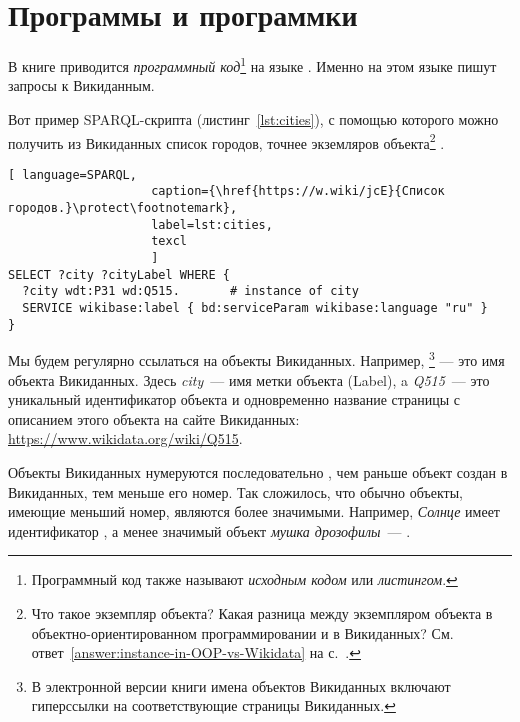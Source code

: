 





\chapter{Программы и программки}
\label{ch:listing_about}

В книге приводится \emph{программный код}\footnote[][0cm]{%
    Программный код также называют  \emph{исходным кодом} или 
    \emph{листингом}.
%   
} на языке . 
Именно на этом языке пишут запросы к Викиданным.


Вот пример SPARQL-скрипта (листинг~\ref{lst:cities}), 
с помощью которого можно получить из Викиданных список городов, 
точнее экземляров объекта\footnote{\label{question:instance-in-OOP-vs-Wikidata}Что такое экземпляр объекта? 
    Какая разница между экземпляром объекта 
    в объектно-ориентированном программировании и в Викиданных?
    См. ответ~\ref{answer:instance-in-OOP-vs-Wikidata} на с.~\pageref{answer:instance-in-OOP-vs-Wikidata}.
    }
.

\begin{lstlisting}[ language=SPARQL, 
                    caption={\href{https://w.wiki/jcE}{Список городов.}\protect\footnotemark},
                    label=lst:cities,
                    texcl 
                    ]
SELECT ?city ?cityLabel WHERE { 
  ?city wdt:P31 wd:Q515.       # instance of city
  SERVICE wikibase:label { bd:serviceParam wikibase:language "ru" }
}
\end{lstlisting}%

Мы будем регулярно ссылаться на объекты Викиданных. 
Например, \footnote[][0cm]{%
%    
    В электронной версии книги имена объектов Викиданных включают гиперссылки на соответствующие страницы Викиданных.
} 
--- это имя объекта Викиданных. 
Здесь \emph{city}~--- имя метки объекта (Label), 
a \emph{Q515}~--- это уникальный идентификатор объекта 
и одновременно название страницы с описанием этого объекта на сайте Викиданных: \href{https://www.wikidata.org/wiki/Q515}{https://www.wikidata.org/wiki/Q515}.

\label{WDObjectsNumbering}
Объекты Викиданных нумеруются последовательно%
, чем раньше объект создан в Викиданных, тем меньше его номер. 
Так сложилось, что обычно объекты, имеющие меньший номер, являются более значимыми. 
Например, \emph{Солнце} имеет идентификатор , а менее значимый объект \emph{мушка дрозофилы}~--- .

